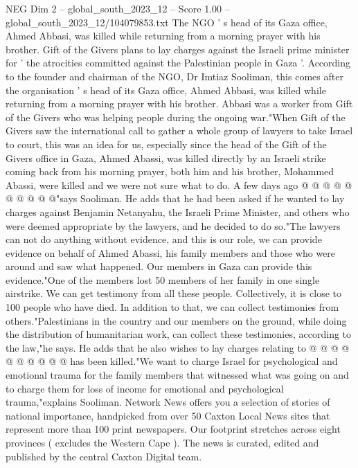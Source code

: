 \begin{textsample}{NEG Dim 2 – global\_south\_2023\_12 – Score 1.00 – global\_south\_2023\_12/104079853.txt}  \label{ex:f2_neg_292}
The NGO ' s head of its Gaza office, Ahmed Abbasi, was killed while returning from a morning prayer with his brother.
Gift of the Givers plans to lay charges against the Israeli prime minister for ' the atrocities committed against the Palestinian people in Gaza '.
According to the founder and chairman of the NGO, Dr Imtiaz Sooliman, this comes after the organisation ' s head of its Gaza office, Ahmed Abbasi, was killed while returning from a morning prayer with his brother.
Abbasi was a worker from Gift of the Givers who was helping people during the ongoing war."When Gift of the Givers saw the international call to gather a whole group of lawyers to take Israel to court, this was an idea for us, especially since the head of the Gift of the Givers office in Gaza, Ahmed Abassi, was killed directly by an Israeli strike coming back from his morning prayer, both him and his brother, Mohammed Abassi, were killed and we were not sure what to do.
A few days ago @ @ @ @ @ @ @ @ @ @"says Sooliman.
He adds that he had been asked if he wanted to lay charges against Benjamin Netanyahu, the Israeli Prime Minister, and others who were deemed appropriate by the lawyers, and he decided to do so."The lawyers can not do anything without evidence, and this is our role, we can provide evidence on behalf of Ahmed Abassi, his family members and those who were around and saw what happened.
Our members in Gaza can provide this evidence."One of the members lost 50 members of her family in one single airstrike.
We can get testimony from all these people.
Collectively, it is close to 100 people who have died.
In addition to that, we can collect testimonies from others."Palestinians in the country and our members on the ground, while doing the distribution of humanitarian work, can collect these testimonies, according to the law,"he says.
He adds that he also wishes to lay charges relating to @ @ @ @ @ @ @ @ @ @ has been killed."We want to charge Israel for psychological and emotional trauma for the family members that witnessed what was going on and to charge them for loss of income for emotional and psychological trauma,"explains Sooliman.
Network News offers you a selection of stories of national importance, handpicked from over 50 Caxton Local News sites that represent more than 100 print newspapers.
Our footprint stretches across eight provinces ( excludes the Western Cape ).
The news is curated, edited and published by the central Caxton Digital team.

\end{textsample}

